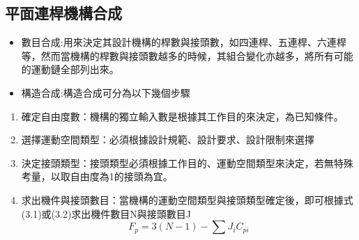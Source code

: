 \documentclass[14pt,a4paper]{report}  %
\newcommand{\fourteen}{\fontsize{14pt}{\baselineskip}\selectfont}%
\begin{document}
{      \fourteen{Cython是結合了Python和C語法的一種語言，使用者可以維持大部分的Python語法，而不需要大幅度調整主要的程式邏輯與演算法。}
      
      
      \subsection{平面連桿機構合成}
      \fourteen{進行機構設計與合成主要流程分為數目合成、構造合成、尺寸合成與運動學模擬，合成皆有其順序性存在，而運動學模擬則是進行分析前面的合成項目。}
      \begin{itemize} 
      \item 數目合成:用來決定其設計機構的桿數與接頭數，如四連桿、五連桿、六連桿等，然而當機構的桿數與接頭數越多的時候，其組合變化亦越多，將所有可能的運動鏈全部列出來。
      \item 構造合成:構造合成可分為以下幾個步驟
      \end{itemize} 
      \begin{enumerate}
      \item 確定自由度數：機構的獨立輸入數是根據其工作目的來決定，為已知條件。
      \item 選擇運動空間類型：必須根據設計規範、設計要求、設計限制來選擇
      \item 決定接頭類型：接頭類型必須根據工作目的、運動空間類型來決定，若無特殊考量，以取自由度為1的接頭為宜。
      \item 求出機件與接頭數目：當機構的運動空間類型與接頭類型確定後，即可根據式(3.1)或(3.2)求出機件數目N與接頭數目J
      \hspace*{\fill} \\
      
      \begin{equation}
      F_{p}=3\left ( N-1 \right )-\sum J_{i}C_{pi}
      \end{equation}  
      

\end{enumerate}}
\end{document}
